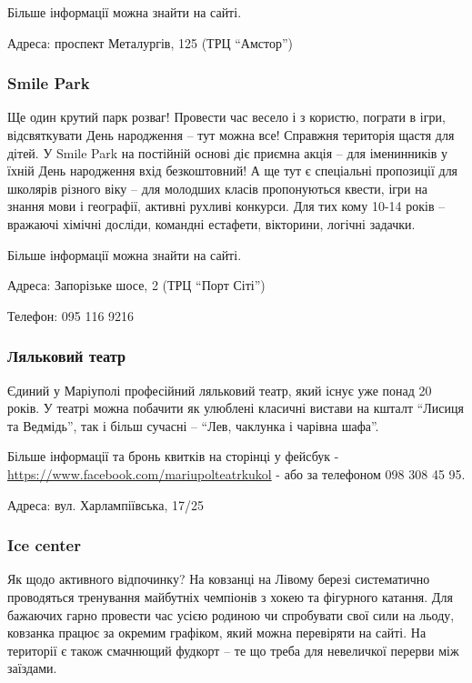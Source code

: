 Більше інформації можна знайти на сайті.

Адреса: проспект Металургів, 125 (ТРЦ \enquote{Амстор})


\subsubsection{Smile Park}

Ще один крутий парк розваг! Провести час весело і з користю, пограти в ігри,
відсвяткувати День народження – тут можна все! Справжня територія щастя для
дітей. У Smile Park на постійній основі діє приємна акція – для іменинників у
їхній День народження вхід безкоштовний! А ще тут є спеціальні пропозиції для
школярів різного віку – для молодших класів пропонуються квести, ігри на знання
мови і географії, активні рухливі конкурси. Для тих кому 10-14 років – вражаючі
хімічні досліди, командні естафети, вікторини, логічні задачки.

Більше інформації можна знайти на сайті.

Адреса: Запорізьке шосе, 2 (ТРЦ \enquote{Порт Сіті})

Телефон: 095 116 9216


\subsubsection{Ляльковий театр}

Єдиний у Маріуполі професійний ляльковий театр, який існує уже понад 20 років.
У театрі можна побачити як улюблені класичні вистави на кшталт \enquote{Лисиця та
Ведмідь}, так і більш сучасні – \enquote{Лев, чаклунка і чарівна шафа}.

Більше інформації та бронь квитків на сторінці у фейсбук - \url{https://www.facebook.com/mariupolteatrkukol} - або за телефоном 098
308 45 95.

Адреса: вул. Харлампіївська, 17/25


\subsubsection{Ice center}

Як щодо активного відпочинку? На ковзанці на Лівому березі систематично
проводяться тренування майбутніх чемпіонів з хокею та фігурного катання. Для
бажаючих гарно провести час усією родиною чи спробувати свої сили на льоду,
ковзанка працює за окремим графіком, який можна перевіряти на сайті. На
території є також смачнющий фудкорт – те що треба для невеличкої перерви між
заїздами.

